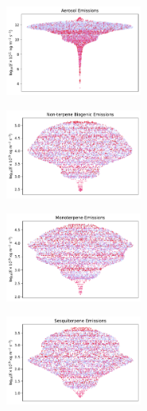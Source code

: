 \begin{figure}[H]
    \centering
    \begin{subfigure}
        \centering
        \includegraphics[width=0.49\textwidth,valign=t]{sosaa-data/figures/trajectories/trajectory-17.05.2018:00.00-aerosols.pdf}
    \end{subfigure}
    \begin{subfigure}
        \centering
        \includegraphics[width=0.49\textwidth,valign=t]{sosaa-data/figures/trajectories/trajectory-17.05.2018:00.00-biogenic.pdf}
    \end{subfigure}
    
    \begin{subfigure}
        \centering
        \includegraphics[width=0.49\textwidth,valign=t]{sosaa-data/figures/trajectories/trajectory-17.05.2018:00.00-monoterpenes.pdf}
    \end{subfigure}
    \begin{subfigure}
        \centering
        \includegraphics[width=0.49\textwidth,valign=t]{sosaa-data/figures/trajectories/trajectory-17.05.2018:00.00-sesquiterpenes.pdf}
    \end{subfigure}


\end{figure}
